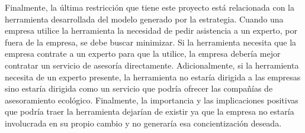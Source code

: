 \hfill

Finalmente, la última restricción que tiene este proyecto está relacionada con la herramienta desarrollada del modelo generado por la estrategia. Cuando una empresa utilice la herramienta la necesidad de pedir asistencia a un experto, por fuera de la empresa, se debe buscar minimizar. Si la herramienta necesita que la empresa contrate a un experto para que la utilice, la empresa debería mejor contratar un servicio de asesoría directamente. Adicionalmente, si la herramienta necesita de un experto presente, la herramienta no estaría dirigida a las empresas sino estaría dirigida como un servicio que podría ofrecer las compañías de asesoramiento ecológico. Finalmente, la importancia y las implicaciones positivas que podría traer la herramienta dejarían de existir ya que la empresa no estaría involucrada en su propio cambio y no generaría esa concientización deseada.